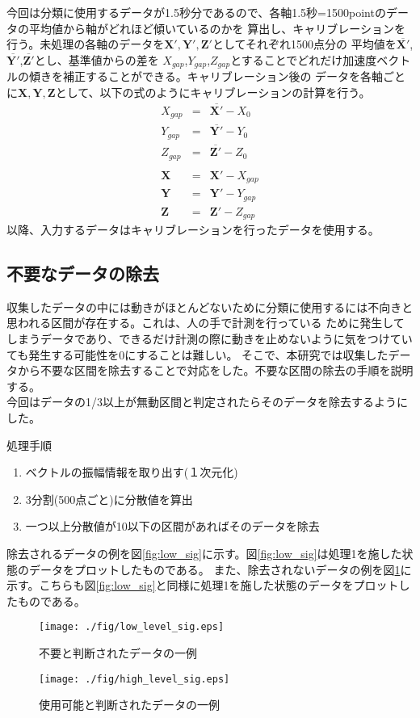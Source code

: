 		今回は分類に使用するデータが1.5秒分であるので、各軸1.5秒=1500pointのデータの平均値から軸がどれほど傾いているのかを
		算出し、キャリブレーションを行う。未処理の各軸のデータを$\bm{X'},\bm{Y'},\bm{Z'}$としてそれぞれ1500点分の
		平均値を$\overline{\bm{X'}}$,$\overline{\bm{Y'}}$,$\overline{\bm{Z'}}$とし、基準値からの差を
		$X_{gap}$,$Y_{gap}$,$Z_{gap}$とすることでどれだけ加速度ベクトルの傾きを補正することができる。キャリブレーション後の
		データを各軸ごとに$\bm{X},\bm{Y},\bm{Z}$として、以下の式のようにキャリブレーションの計算を行う。
		\begin{eqnarray*}
			X_{gap}&=&\overline{\bm{X'}} - X_{0}\\
			Y_{gap}&=&\overline{\bm{Y'}} - Y_{0}\\
			Z_{gap}&=&\overline{\bm{Z'}} - Z_{0}\\
		                \\
			\bm{X}&=&\bm{X'} - X_{gap}\\
			\bm{Y}&=&\bm{Y'} - Y_{gap}\\
			\bm{Z}&=&\bm{Z'} - Z_{gap}
		\end{eqnarray*}
		以降、入力するデータはキャリブレーションを行ったデータを使用する。\\
\subsection{不要なデータの除去}
収集したデータの中には動きがほとんどないために分類に使用するには不向きと思われる区間が存在する。これは、人の手で計測を行っている
ために発生してしまうデータであり、できるだけ計測の際に動きを止めないように気をつけていても発生する可能性を0にすることは難しい。
そこで、本研究では収集したデータから不要な区間を除去することで対応をした。不要な区間の除去の手順を説明する。\\

今回はデータの1/3以上が無動区間と判定されたらそのデータを除去するようにした。\\
\begin{itembox}[l]{処理手順}
	\begin{enumerate}
		\item{ベクトルの振幅情報を取り出す(１次元化) }
		\item{3分割(500点ごと)に分散値を算出　}
		\item{一つ以上分散値が10以下の区間があればそのデータを除去}
	\end{enumerate}
\end{itembox}
除去されるデータの例を図\ref{fig:low_sig}に示す。図\ref{fig:low_sig}は処理1を施した状態のデータをプロットしたものである。
また、除去されないデータの例を図\ref{fig:high_sig}に示す。こちらも図\ref{fig:low_sig}と同様に処理1を施した状態のデータをプロットしたものである。
\begin{figure}[htbp]
	\begin{center}
	  \texttt{[image: ./fig/low\_level\_sig.eps]}
	  \caption{不要と判断されたデータの一例}
	  \label{fig:low_sig}

	  \texttt{[image: ./fig/high\_level\_sig.eps]}
	  \caption{使用可能と判断されたデータの一例}
	  \label{fig:high_sig}
	\end{center}
\end{figure}


